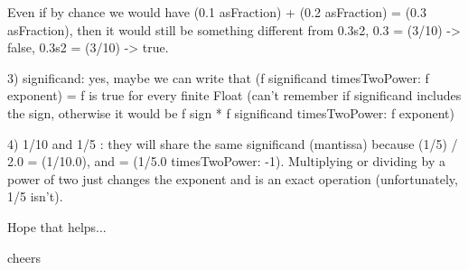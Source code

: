 \documentclass[a4paper,10pt,twoside]{book}
\begin{document}
Even if by chance we would have  (0.1 asFraction) + (0.2 asFraction) =
(0.3 asFraction), then it would still be something different from
0.3s2, 0.3 = (3/10) -> false, 0.3s2 = (3/10) -> true.

3) significand: yes, maybe we can write that (f significand
timesTwoPower: f exponent) = f is true for every finite Float (can't
remember if significand includes the sign, otherwise it would be f
sign * f significand timesTwoPower: f exponent)

4) 1/10 and 1/5 : they will share the same significand (mantissa)
because (1/5) / 2.0 = (1/10.0), and = (1/5.0 timesTwoPower: -1).
Multiplying or dividing by a power of two just changes the exponent
and is an exact operation (unfortunately, 1/5 isn't).

Hope that helps...

cheers



\ifx\wholebook\relax\else
   
   
\end{document}
